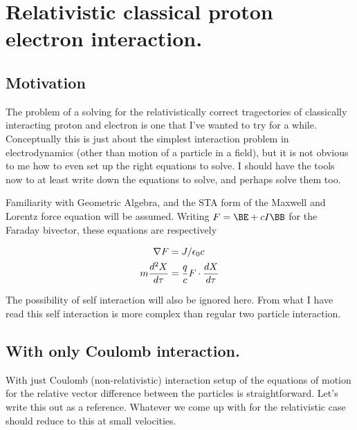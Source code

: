 

\chapter{Relativistic classical proton electron interaction.}
\label{chap:nuclearInteraction}
{}
\date{Sept 13, 2009}

\beginArtWithToc

\section{Motivation}

The problem of a solving for the relativistically correct tragectories of classically interacting proton and electron is one that I've wanted to try for a while.  Conceptually this is just about the simplest interaction problem in electrodynamics (other than motion of a particle in a field), but it is not obvious to me how to even set up the right equations to solve.  I should have the tools now to at least write down the equations to solve, and perhaps solve them too.

Familiarity with Geometric Algebra, and the STA form of the Maxwell and Lorentz force equation will be assumed.  Writing $F = \BE + c I \BB$ for the Faraday bivector, these equations are respectively

\begin{align}\label{eqn:nuclearInteraction:boo1}
\nabla F &= J/\epsilon_0 c \\
m\frac{d^2 X}{d\tau} &= \frac{q}{c} F \cdot \frac{dX}{d\tau}
\end{align}

The possibility of self interaction will also be ignored here.  From what I have read this self interaction is more complex than regular two particle interaction.

\section{With only Coulomb interaction.}

With just Coulomb (non-relativistic) interaction setup of the equations of motion for the relative vector difference between the particles is straightforward.  Let's write this out as a reference.  Whatever we come up with for the relativistic case should reduce to this at small velocities.

